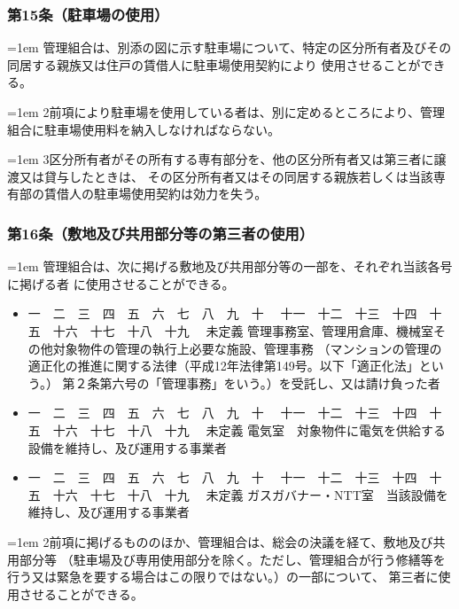 \documentclass[
  luatex,
  paper=a4paper,
  fontsize=11pt,
  jafontsize=11pt,
  jlreq_notes,
]{jlreq}
\newcommand{\joumain}[1]{%
  \noindent\hangindent=1em\hangafter=1
  \hspace{1em}#1%
}
\newcommand{\kou}[2]{%
  \par\noindent\hangindent=1em\hangafter=1
  #1\hspace{1em}#2%
}
\def\toKansuji#1{
  \tempvls=#1
  \ifcase\tempvls
    \or 一　\or 二　\or 三　\or 四　\or 五　\or 六　\or 七　\or 八　\or 九　\or 十　
    \or 十一　\or 十二　\or 十三　\or 十四　\or 十五　\or 十六　\or 十七　\or 十八　\or 十九　
  \else 未定義
  \fi
}
\begin{document}
  \subsubsection*{第15条（駐車場の使用）}
  \joumain{管理組合は、別添の図に示す駐車場について、特定の区分所有者及びその同居する親族又は住戸の賃借人に駐車場使用契約により
  使用させることができる。}
  \kou{2}{前項により駐車場を使用している者は、別に定めるところにより、管理組合に駐車場使用料を納入しなければならない。}
  \kou{3}{区分所有者がその所有する専有部分を、他の区分所有者又は第三者に譲渡又は貸与したときは、
  その区分所有者又はその同居する親族若しくは当該専有部の賃借人の駐車場使用契約は効力を失う。}

  \subsubsection*{第16条（敷地及び共用部分等の第三者の使用）}
  \joumain{管理組合は、次に掲げる敷地及び共用部分等の一部を、それぞれ当該各号に掲げる者 に使用させることができる。}
  \begin{itemize}[label={}, leftmargin=3em, itemindent=-2em]
    \item \toKansuji{1}管理事務室、管理用倉庫、機械室その他対象物件の管理の執行上必要な施設、管理事務
      （マンションの管理の適正化の推進に関する法律（平成12年法律第149号。以下「適正化法」という。）
      第２条第六号の「管理事務」をいう。）を受託し、又は請け負った者
    \item \toKansuji{2}電気室　対象物件に電気を供給する設備を維持し、及び運用する事業者
    \item \toKansuji{3}ガスガバナー・NTT室　当該設備を維持し、及び運用する事業者
  \end{itemize}
  \kou{2}{前項に掲げるもののほか、管理組合は、総会の決議を経て、敷地及び共用部分等
  （駐車場及び専用使用部分を除く。ただし、管理組合が行う修繕等を行う又は緊急を要する場合はこの限りではない。）の一部について、
  第三者に使用させることができる。}
\end{document}
